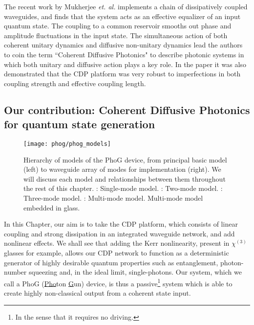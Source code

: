 The recent work by Mukherjee \emph{et. al.} \cite{Mukherjee2017} implements a chain of dissipatively coupled waveguides, and finds that the system acts as an effective equalizer of an input quantum state. The coupling to a common reservoir smooths out phase and amplitude fluctuations in the input state. The simultaneous action of both coherent unitary dynamics and diffusive non-unitary dynamics lead the authors to coin the term ``Coherent Diffusive Photonics" to describe photonic systems in which both unitary and diffusive action plays a key role. In the paper it was also demonstrated that the CDP platform was very robust to imperfections in both coupling strength and effective coupling length.

\subsection{Our contribution: Coherent Diffusive Photonics for quantum state generation}

\begin{figure}[htp]
\captionsetup{width=0.8\linewidth}
\centering
\texttt{[image: phog/phog\_models]}
\caption{\label{fig:phog_models} Hierarchy of models of the PhoG device, from principal basic model (left) to waveguide array of modes for implementation (right). We will discuss each model and relationships between them throughout the rest of this chapter. \MakeUppercase{}: Single-mode model. \MakeUppercase{}: Two-mode model. \MakeUppercase{}: Three-mode model. \MakeUppercase{}: Multi-mode model. \MakeUppercase{} Multi-mode model embedded in glass. }
\end{figure}

In this Chapter, our aim is to take the CDP platform, which consists of linear coupling and strong dissipation in an integrated waveguide network, and add nonlinear effects. We shall see that adding the Kerr nonlinearity, present in $\chi^{\left(3\right)}$ glasses for example, allows our CDP network to function as a deterministic generator of highly desirable quantum properties such as entanglement, photon-number squeezing and, in the ideal limit, single-photons. Our system, which we call a PhoG (\underline{Pho}ton \underline{G}un) device, is thus a passive\footnote{In the sense that it requires no driving.} system which is able to create highly non-classical output from a coherent state input.


